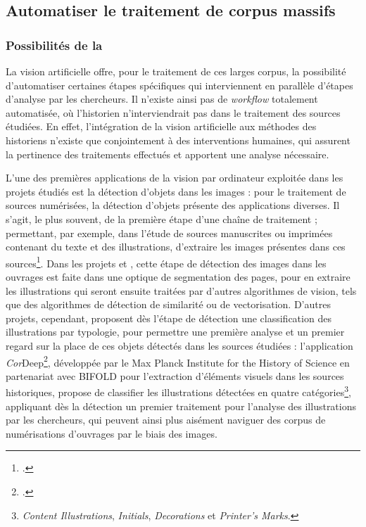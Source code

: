    \subsection{Automatiser le traitement de corpus massifs}
        \subsubsection{Possibilités de la \cv}
La vision artificielle offre, pour le traitement de ces larges corpus, la possibilité d'automatiser certaines étapes spécifiques qui interviennent en parallèle d'étapes d'analyse par les chercheurs. Il n'existe ainsi pas de \textit{workflow} totalement automatisée, où l'historien n'interviendrait pas dans le traitement des sources étudiées. En effet, l'intégration de la vision artificielle aux méthodes des historiens n'existe que conjointement à des interventions humaines, qui assurent la pertinence des traitements effectués et apportent une analyse nécessaire.

L'une des premières applications de la vision par ordinateur exploitée dans les projets étudiés est la détection d'objets dans les images : pour le traitement de sources numérisées, la détection d'objets présente des applications diverses. Il s'agit, le plus souvent, de la première étape d'une chaîne de traitement ; permettant, par exemple, dans l'étude de sources manuscrites ou imprimées contenant du texte et des illustrations, d'extraire les images présentes dans ces sources\footcite{buttnerCorDeepSacroboscoDataset2022}. Dans les projets \eida et \vhs, cette étape de détection des images dans les ouvrages est faite dans une optique de segmentation des pages, pour en extraire les illustrations qui seront ensuite traitées par d'autres algorithmes de vision, tels que des algorithmes de détection de similarité ou de vectorisation. D'autres projets, cependant, proposent dès l'étape de détection une classification des illustrations par typologie, pour permettre une première analyse et un premier regard sur la place de ces objets détectés dans les sources étudiées : l'application \textit{Cor}Deep\footcite{CorDeep}, développée par le Max Planck Institute for the History of Science en partenariat avec BIFOLD pour l'extraction d'éléments visuels dans les sources historiques, propose de classifier les illustrations détectées en quatre catégories\footnote{\textit{Content Illustrations}, \textit{Initials}, \textit{Decorations} et \textit{Printer's Marks}.}, appliquant dès la détection un premier traitement pour l'analyse des illustrations par les chercheurs, qui peuvent ainsi plus aisément naviguer des corpus de numérisations d'ouvrages par le biais des images.

